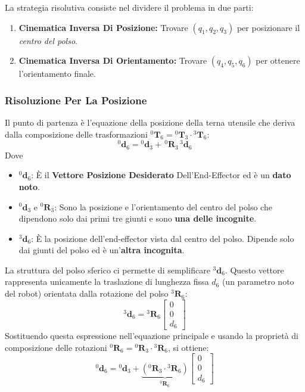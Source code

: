 \documentclass[11pt, a4paper]{report}
\begin{document}
La strategia risolutiva consiste nel dividere il problema in due parti:
\begin{enumerate}
    \item \textbf{Cinematica Inversa Di Posizione:}    Trovare $(q_1, q_2, q_3)$ per posizionare il \textit{centro del polso}.
    \item \textbf{Cinematica Inversa Di Orientamento:} Trovare $(q_4, q_5, q_6)$ per ottenere l'orientamento finale.
\end{enumerate}
\subsubsection*{Risoluzione Per La Posizione}
Il punto di partenza è l'equazione della posizione della terna utensile che deriva dalla composizione delle trasformazioni \({}^{0}\mathbf{T}_{6} = {}^{0}\mathbf{T}_{3} \cdot {}^{3}\mathbf{T}_{6}\):
\[
    {}^{0}\mathbf{d}_{6} = {}^{0}\mathbf{d}_{3} + \, {}^0\mathbf{R}_3 \, {}^{3}\mathbf{d}_{6}
\]
Dove
\begin{itemize}
    \item \({}^{0}\mathbf{d}_{6}\): È il \textbf{Vettore Posizione Desiderato} Dell'End-Effector ed è un \textbf{dato noto}.
    \item \({}^{0}\mathbf{d}_{3}\) e \({}^0\mathbf{R}_3\): Sono la posizione e l'orientamento del centro del polso che dipendono solo dai primi tre giunti e sono \textbf{una delle incognite}.
    \item \({}^{3}\mathbf{d}_{6}\): È la posizione dell'end-effector vista dal centro del polso. Dipende solo dai giunti del polso ed è un'\textbf{altra incognita}.
\end{itemize}
La struttura del polso sferico ci permette di semplificare \({}^{3}\mathbf{d}_{6}\). Questo vettore rappresenta unicamente la traslazione di lunghezza fissa \(d_6\) (un parametro noto del robot) orientata dalla rotazione del polso \({}^3\mathbf{R}_6\):
\[
    {}^{3}\mathbf{d}_{6} = {}^3\mathbf{R}_6
    \begin{bmatrix} 0 \\ 0 \\ d_6 \end{bmatrix}
\]
Sostituendo questa espressione nell'equazione principale e usando la proprietà di composizione delle rotazioni \({}^0\mathbf{R}_6 = {}^0\mathbf{R}_3 \cdot {}^3\mathbf{R}_6\), si ottiene:
\[
    {}^{0}\mathbf{d}_{6} = {}^{0}\mathbf{d}_{3} + \underbrace{({}^0\mathbf{R}_3 \cdot {}^3\mathbf{R}_6)}_{{}^0\mathbf{R}_6} \begin{bmatrix} 0 \\ 0 \\ d_6 \end{bmatrix}
\]
\end{document}
